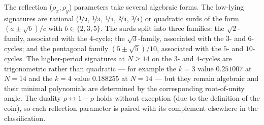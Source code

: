 The reflection ($\rho_x, \rho_y$) parameters take several algebraic forms. The
low-lying signatures are rational ($\nicefrac{1}{2}$,
$\nicefrac{1}{3}$, $\nicefrac{1}{4}$, $\nicefrac{2}{3}$,
$\nicefrac{3}{4}$) or quadratic surds of the form
$(a \pm \sqrt{b})/c$ with $b \in \{2, 3, 5\}$. The surds
split into three families: the $\sqrt{2}$-family, associated
with the $4$-cycle; the $\sqrt{3}$-family, associated with the
$3$- and $6$-cycles; and the pentagonal family
$(5 \pm \sqrt{5})/10$, associated with the $5$- and
$10$-cycles. The higher-period signatures at $N \ge 14$ on
the $3$- and $4$-cycles are trigonometric rather than
quadratic --- for example the $k=3$ value $0.251007$ at
$N=14$ and the $k=4$ value $0.188255$ at $N=14$ --- but they
remain algebraic and their minimal polynomials are determined
by the corresponding root-of-unity angle. The duality
$\rho \leftrightarrow 1 - \rho$ holds without exception
(due to the definition of the coin), so
each reflection parameter is paired with its complement
elsewhere in the classification.
